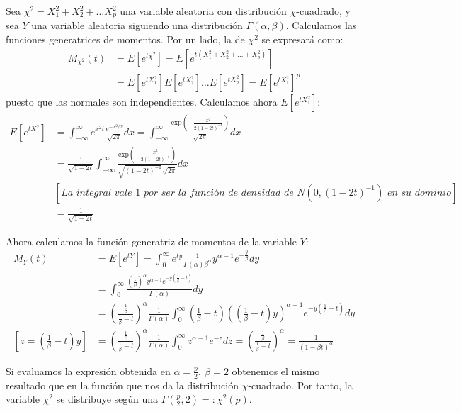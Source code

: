 \documentclass[a4paper, 10pt]{article} %
\begin{document}
Sea $\chi^2=X_1^2+X_2^2+\dots X_p^2$ una variable aleatoria con distribución $\chi$-cuadrado, y sea $Y$ una variable aleatoria siguiendo una distribución $\Gamma(\alpha, \beta)$. Calculamos las funciones generatrices de momentos. Por un lado, la de $\chi^2$ se expresará como:
\begin{align*}
  M_{\chi^2}(t)
  &=E\left[e^{t\chi^2}\right]=E\left[e^{t(X_1^2+X_2^2+\dots+X_p^2)}\right]\\
  &=E\left[e^{tX_1^2}\right]E\left[e^{tX_2^2}\right]\dots E\left[e^{tX_p^2}\right]
    =E\left[e^{tX_1^2}\right]^p
\end{align*}
puesto que las normales son independientes. Calculamos ahora $E\left[e^{tX_1^2}\right]$:
\begin{align*}
  E\left[e^{tX_1^2}\right]
  &=\int_{-\infty}^\infty e^{x^2t}\frac{e^{-x^2/2}}{\sqrt{2\pi}} dx
   =\int_{-\infty}^\infty\frac{\mathrm{exp}\left(-\frac{x^2}{2(1-2t)^{-1}}\right)}{\sqrt{2\pi}} dx\\
  &=\frac 1 {\sqrt{1-2t}}
    \int_{-\infty}^\infty\frac{\mathrm{exp}\left(-\frac{x^2}{2(1-2t)^{-1}}\right)}{\sqrt{(1-2t)^{-1}}\sqrt{2\pi}} dx\\
  &\left[\textit{La integral vale 1 por ser la función de densidad de }N(0,(1-2t)^{-1})\textit{ en su dominio}\right]\\
  &=\frac 1 {\sqrt{1-2t}}
\end{align*}

Ahora calculamos la función generatriz de momentos de la variable $Y$:
\begin{align*}
  M_Y(t)&=E\left[e^{tY}\right]=\int_0^\infty e^{ty} \frac 1 {\Gamma(\alpha)\beta^\alpha}y^{\alpha-1}e^{-\frac y \beta} dy\\
  &=\int_0^\infty \frac{\left(\frac 1 \beta\right)^\alpha y^{\alpha-1}e^{-y\left(\frac 1 \beta - t\right)}}{\Gamma(\alpha)} dy\\
  &= \left(\frac{\frac 1 \beta}{\frac 1 \beta - t}\right)^\alpha\frac 1 {\Gamma(\alpha)}
     \int_0^\infty \left(\frac 1 \beta - t\right)\left(\left(\frac 1 \beta - t\right)y\right)^{\alpha-1}e^{-y\left(\frac 1 \beta - t\right)} dy\\
  \left[z=\left(\frac 1 \beta - t\right)y\right] &= \left(\frac{\frac 1 \beta}{\frac 1 \beta - t}\right)^\alpha\frac 1 {\Gamma(\alpha)}
     \int_0^\infty z^{\alpha-1}e^{-z} dz=
     \left(\frac{\frac 1 \beta}{\frac 1 \beta - t}\right)^\alpha=\frac 1 {(1 -\beta t)^\alpha}
\end{align*}

Si evaluamos la expresión obtenida en $\alpha=\frac p 2,~\beta=2$ obtenemos el mismo resultado que en la función que nos da la distribución $\chi$-cuadrado. Por tanto, la variable $\chi^2$ se distribuye según una $\Gamma(\frac p 2, 2)=:\chi^2(p)$.
\end{document}
